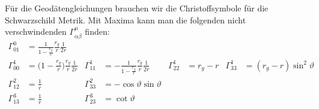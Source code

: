 %
Für die Geodätengleichungen brauchen wir die Christoffsymbole 
für die Schwarzschild Metrik.
Mit Maxima kann man die folgenden nicht verschwindenden
$\Gamma^\mu_{\alpha\beta}$ 
finden:
\begin{align*}
\Gamma^0_{01}
&=
\frac{1}{1-\displaystyle\frac{r_g}{r}}
\frac{r_g}{r}
\frac{1}{2r}
\\
\Gamma^1_{00}
&=
\biggl(1-\displaystyle\frac{r_g}{r}\biggr)
\frac{r_g}{r}
\frac{1}{2r}
&
\Gamma^1_{11}
&=
-\frac1{1-\displaystyle\frac{r_g}{r}}
\frac{r_g}{r}
\frac{1}{2r}
&
\Gamma^1_{22}
&=
r_g-r
&
\Gamma^1_{33}
&=
(r_g-r)\sin^2\vartheta
\\
\Gamma^2_{12}
&=
\frac1r
&
\Gamma^2_{33}
&=
-\cos\vartheta \sin\vartheta
\\
\Gamma^3_{13}
&=
\frac1r
&
\Gamma^3_{23}
&=
\cot\vartheta
\end{align*}
